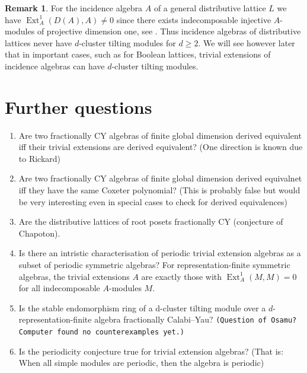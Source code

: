 \documentclass[a4paper,reqno,11pt]{amsart}
\theoremstyle{definition}
\newtheorem{remark}[theorem]{Remark}
\newcommand{\Ext}{\operatorname{Ext}\nolimits}
\numberwithin{equation}{section}
\begin{document}
{\begin{remark}
For the incidence algebra $A$ of a general distributive lattice $L$ we have \newline $\Ext_A^1(D(A),A) \neq 0$ since there exists indecomposable injective $A$-modules of projective dimension one, see \cite{IM}. Thus incidence algebras of distributive lattices never have $d$-cluster tilting modules for $d \geq 2$. We will see however later that in important cases, such as for Boolean lattices, trivial extensions of incidence algebras can have $d$-cluster tilting modules.
\end{remark}
}




\section{Further questions}

\begin{enumerate}
\item Are two fractionally CY algebras of finite global dimension derived equivalent iff their trivial extensions are derived equivalent? (One direction is known due to Rickard)
\item Are two fractionally CY algebras of finite global dimension derived equivalnet iff they have the same Coxeter polynomial? (This is probably false but would be very interesting even in special cases to check for derived equivalences)
\item Are the distributive lattices of root posets fractionally CY (conjecture of Chapoton).
\item Is there an intristic characterisation of periodic trivial extension algebras as a subset of periodic symmetric algebras? For representation-finite symmetric algebras, the trivial extensions $A$ are exactly those with $\Ext_A^1(M,M)=0$ for all indecomposable $A$-modules $M$.
\item Is the stable endomorphism ring of a d-cluster tilting module over a $d$-representation-finite algebra fractionally Calabi--Yau? \texttt{(Question of Osamu? Computer found no counterexamples yet.)}
\item Is the periodicity conjecture true for trivial extension algebras? (That is: When all simple modules are periodic, then the algebra is periodic)
\end{enumerate}
\end{document}
